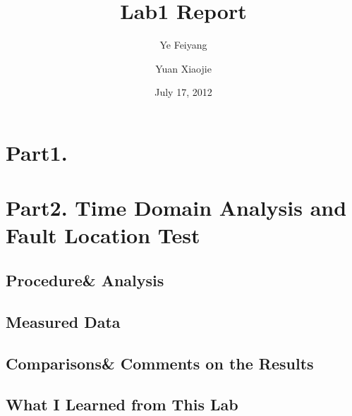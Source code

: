 \documentclass[11pt,oneside,a4paper]{report}
\begin{document}
\title{Lab1 Report}
\author{Ye Feiyang \and Yuan Xiaojie}
\date{July 17, 2012}
\maketitle

\section*{Part1. }

\section*{Part2. Time Domain Analysis and Fault Location Test}
\subsection*{Procedure\& Analysis}

\subsection*{Measured Data}

\subsection*{Comparisons\& Comments on the Results}

\subsection*{What I Learned from This Lab}
\end{document}
